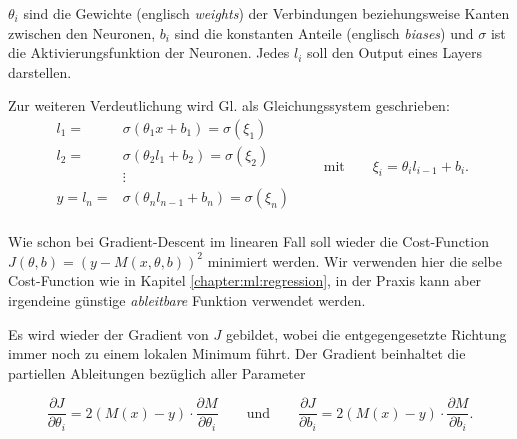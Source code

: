 $\theta_i$ sind die Gewichte (englisch \emph{weights}) der Verbindungen beziehungsweise
Kanten zwischen den Neuronen, $b_i$ sind die konstanten Anteile (englisch \emph{biases})
und $\sigma$ ist die Aktivierungsfunktion der Neuronen. Jedes $l_i$ soll den Output eines
Layers darstellen.

Zur weiteren Verdeutlichung wird Gl.  als Gleichungssystem
geschrieben:
\begin{equation}
    \begin{aligned}
        l_1 = &\sigma(\theta_1 x + b_1) = \sigma(\xi_1)\\
        l_2 = &\sigma(\theta_2 l_1 + b_2) = \sigma(\xi_2)\\
        &\vdots\\
        y=l_n = &\sigma(\theta_n l_{n-1} + b_n) = \sigma(\xi_n)\\
    \end{aligned}
    \qquad\text{mit}\qquad
    \xi_i = \theta_i l_{i-1} + b_i
    .
\end{equation}

Wie schon bei Gradient-Descent im linearen Fall soll wieder die Cost-Function $J(\theta,b)
= (y - M(x, \theta, b))^2$ minimiert werden. Wir verwenden hier die selbe Cost-Function
wie in Kapitel \ref{chapter:ml:regression}, in der Praxis kann aber irgendeine günstige
\emph{ableitbare} Funktion verwendet werden.

Es wird wieder der Gradient von $J$ gebildet, wobei die entgegengesetzte Richtung immer
noch zu einem lokalen Minimum führt. Der Gradient beinhaltet die partiellen Ableitungen
bezüglich aller Parameter

\begin{equation}
    \frac{\partial J}{\partial \theta_i} = 2(M(x) - y) \cdot \frac{\partial M}{\partial \theta_i}
    \qquad\text{und}\qquad
    \frac{\partial J}{\partial b_i} = 2(M(x) - y) \cdot \frac{\partial M}{\partial b_i}.
\end{equation}

